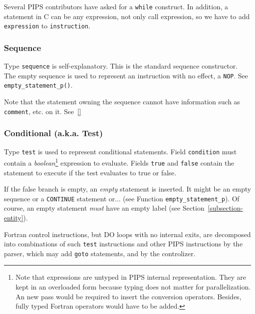 \documentclass[a4paper]{article}
\begin{document}
Several PIPS contributors have asked for a \verb/while/ construct.
In addition, a statement in C can be any expression, not only call
expression, so we have to add \verb/expression/ to \verb/instruction/.


\subsubsection{Sequence}
\label{subsubsection-sequence}

Type \texttt{sequence} is self-explanatory. This is the standard sequence
constructor. The empty sequence is used to represent an instruction with
no effect, a \texttt{NOP}. See \texttt{empty\_statement\_p()}.

Note that the statement owning the sequence cannot have information
such as \verb|comment|, etc. on it. See~\ref{}

\subsubsection{Conditional (a.k.a. Test)}
\label{subsubsection-test}


Type \texttt{test} is used to represent conditional statements. Field
\texttt{condition} must contain a \emph{boolean}\footnote{Note that expressions
are untyped in PIPS internal representation. They are kept in an
overloaded form because typing does not matter for parallelization. An
new pass would be required to insert the conversion operators. Besides,
fully typed Fortran operators would have to be added.} expression to
evaluate. Fields \texttt{true} and \texttt{false} contain the statement to
execute if the test evaluates to true or false.

If the false branch is empty, an \emph{empty} statement is inserted. It might
be an empty sequence or a \texttt{CONTINUE} statement or... (see Function
\texttt{empty\_statement\_p}). Of course, an empty statement \emph{must} have
an empty label (see Section~\ref{subsection-entity}).

Fortran control instructions, but DO loops with no internal exits, are decomposed into
combinations of such \texttt{test} instructions and other PIPS instructions
by the parser, which may add \texttt{goto} statements, and by the controlizer.

\begin{comment}
Le domaine \verb/test/ permet de repr�senter toutes les instructions � base
de contr�le. Le sous-domaine \verb/condition/ contient l'expression �
tester, et les deux sous-domaines \verb/true/ et \verb/false/ contiennent les
instructions � ex�cuter selon la valeur du test.

Il faut noter que chaque instruction de contr�le de Fortran,
� l'exception de l'instruction \verb/DO/, est
transform�e en une combinaison s�mantiquement �quivalente de \verb/test/s
et de \verb/goto/s.
\end{comment}
\end{document}
